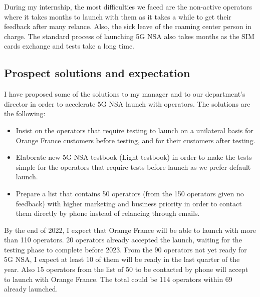 During my internship, the most difficulties we faced are the non-active operators where it takes months to launch with them as it takes a while to get their feedback after many relance. Also, the sick leave of the roaming center person in charge. The standard process of launching \acs{5G} \acs{NSA} also takes months as the \acs{SIM} cards exchange and tests take a long time.\\

\subsection{Prospect solutions and expectation}
\-\hspace{0.5cm} I have proposed some of the solutions to my manager and to our department’s director in order to accelerate \acs{5G} \acs{NSA} launch with operators. The solutions are the following:
\begin{itemize}
    \item Insist on the operators that require testing to launch on a unilateral basis for Orange France customers before testing, and for their customers after testing. 
    \item Elaborate new \acs{5G} \acs{NSA} testbook (Light testbook) in order to make the tests simple for the operators that require tests before launch as we prefer default launch. 
    \item Prepare a list that contains 50 operators (from the 150 operators given no feedback) with higher marketing and business priority in order to contact them directly by phone instead of relancing through emails.  
    
\end{itemize}

By the end of 2022, I expect that Orange France will be able to launch with more than 110 operators. 20 operators already accepted the launch, waiting for the testing phase to complete before 2023. From the 90 operators not yet ready for \acs{5G} \acs{NSA}, I expect at least 10 of them will be ready in the last quarter of the year. Also 15 operators from the list of 50 to be contacted by phone will accept to launch with Orange France. The total could be 114 operators within 69 already launched. 




